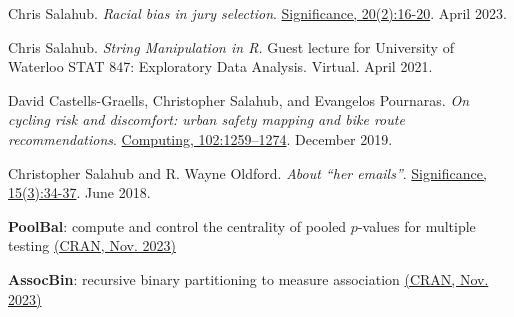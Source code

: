 \documentclass[a4paper,11pt]{article}
\newenvironment{compactDesc}
{ \begin{description}
		\setlength{\itemsep}{2pt}
		\setlength{\parskip}{2pt}
		\setlength{\parsep}{1pt}     }
	{ \end{description}                  }
\begin{document}
\vspace{0.3cm}

 \hrulefill

\begin{compactDesc}
	\item
	Chris Salahub. \textit{Racial bias in jury selection}. \href{https://academic.oup.com/jrssig/article/20/2/16/7095719}{Significance, 20(2):16-20}. April 2023.
	\item
	Chris Salahub. \textit{String Manipulation in R.} Guest lecture for University of Waterloo STAT 847: Exploratory Data Analysis. Virtual. April 2021.
	\item
	David Castells-Graells, Christopher Salahub, and Evangelos Pournaras. \textit{On cycling risk and discomfort: urban safety mapping and bike route recommendations}. \href{https://link.springer.com/article/10.1007\%2Fs00607-019-00771-y}{Computing, 102:1259–1274}. December 2019.
	\item
	Christopher Salahub and R. Wayne Oldford. \textit{About ``her emails''}. \href{https://rss.onlinelibrary.wiley.com/doi/full/10.1111/j.1740-9713.2018.01148.x}{Significance, 15(3):34-37}. June 2018. 
\end{compactDesc}

\vspace{0.3cm}
 \hrulefill

\begin{compactDesc}
	\item[\textbf{PoolBal}:] compute and control the centrality of pooled $p$-values for multiple testing \href{https://cran.r-project.org/web/packages/PoolBal/index.html}{(CRAN, Nov. 2023)}
	\item[\textbf{AssocBin}:] recursive binary partitioning to measure association \href{https://cran.r-project.org/web/packages/AssocBin/index.html}{(CRAN, Nov. 2023)}
\end{compactDesc}

\vspace{0.3cm}
 \hrulefill
\end{document}
